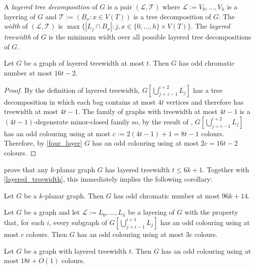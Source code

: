 \documentclass{patmorin}
\begin{document}
A \emph{layered tree decomposition} of $G$ is a pair $(\mathcal{L},\mathcal{T})$ where $\mathcal{L}:=V_0,\ldots,V_h$ is a layering of $G$ and $\mathcal{T}:=(B_x:x\in V(T))$ is a tree decomposition of $G$.  The \emph{width} of $(\mathcal{L},\mathcal{T})$ is $\max\{|L_j\cap B_x|:j,x\in\{0,\ldots,h\}\times V(T)\}$.  The \emph{layered treewidth} of $G$ is the minimum width over all possible layered tree decompositions of $G$.


\begin{cor}\label{layered_treewidth}
  Let $G$ be a graph of layered treewidth at most $t$.  Then $G$ has odd chromatic number at most $16t-2$.
\end{cor}

\begin{proof}
  By the definition of layered treewidth, $G[\bigcup_{j=i-1}^{i+2}L_{j}]$ has a tree decomposition in which each bag contains at most $4t$ vertices and therefore has treewidth at most $4t-1$.  The family of graphs with treewidth at most $4t-1$ is a $(4t-1)$-degenerate minor-closed family so, by the result of \citet{cranston.XX}, $G[\bigcup_{j=i-1}^{i+2}L_{j}]$ has an odd colouring using at most $c:=2(4t-1)+1=8t-1$ colours.  Therefore, by \cref{four_layer} $G$ has an odd colouring using at most $2c=16t-2$ colours.
\end{proof}

\citet{dujmovic.eppstein.ea:genus} prove that any $k$-planar graph $G$ has layered treewidth $t\le 6k+1$.  Together with \cref{layered_treewidth}, this immediately implies the following corollary:

\begin{cor}\label{k_planar}
  Let $G$ be a $k$-planar graph.  Then $G$ has odd chromatic number at most $96k+14$.
\end{cor}

\begin{lem}\label{three_layer}
  Let $G$ be a graph and let $\mathcal{L}:=L_0,\ldots,L_h$ be a layering of $G$ with the property that, for each $i$, every subgraph of $G[\bigcup_{j=i-1}^{i+1}L_{j}]$ has an odd colouring using at most $c$ colours. Then $G$ has an odd colouring using at most $3c$ colours.
\end{lem}





\begin{thm}
  Let $G$ be a graph with layered treewidth $t$.  Then $G$ has an odd colouring using at most $18t+O(1)$ colours.
\end{thm}
\end{document}
